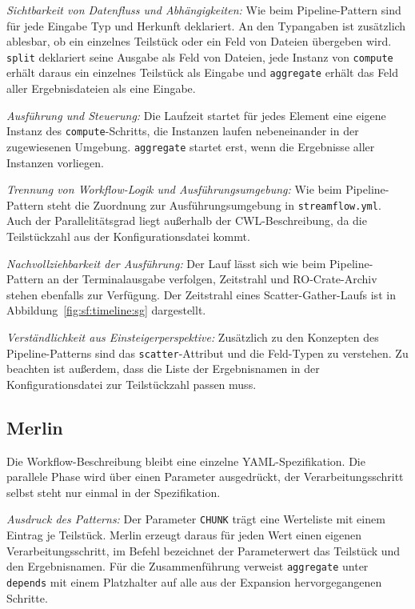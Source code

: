 \emph{Sichtbarkeit von Datenfluss und Abhängigkeiten:} Wie beim
Pipeline-Pattern sind für jede Eingabe Typ und Herkunft deklariert.
An den Typangaben ist zusätzlich ablesbar, ob ein einzelnes Teilstück
oder ein Feld von Dateien übergeben wird. \texttt{split} deklariert
seine Ausgabe als Feld von Dateien, jede Instanz von \texttt{compute}
erhält daraus ein einzelnes Teilstück als Eingabe und
\texttt{aggregate} erhält das Feld aller Ergebnisdateien als eine
Eingabe.

\emph{Ausführung und Steuerung:} Die Laufzeit startet für jedes
Element eine eigene Instanz des \texttt{compute}-Schritts, die
Instanzen laufen nebeneinander in der zugewiesenen Umgebung.
\texttt{aggregate} startet erst, wenn die Ergebnisse aller Instanzen
vorliegen.

\emph{Trennung von Workflow-Logik und Ausführungsumgebung:} Wie beim
Pipeline-Pattern steht die Zuordnung zur Ausführungsumgebung in
\texttt{streamflow.yml}. Auch der Parallelitätsgrad liegt außerhalb
der CWL-Beschreibung, da die Teilstückzahl aus der
Konfigurationsdatei kommt.


\emph{Nachvollziehbarkeit der Ausführung:} Der Lauf lässt sich wie
beim Pipeline-Pattern an der Terminalausgabe verfolgen, Zeitstrahl
und RO-Crate-Archiv stehen ebenfalls zur Verfügung. Der Zeitstrahl
eines Scatter-Gather-Laufs ist in
Abbildung~\ref{fig:sf:timeline:sg} dargestellt.

\emph{Verständlichkeit aus Einsteigerperspektive:} Zusätzlich zu den
Konzepten des Pipeline-Patterns sind das \texttt{scatter}-Attribut
und die Feld-Typen zu verstehen. Zu beachten ist außerdem, dass die
Liste der Ergebnisnamen in der Konfigurationsdatei zur Teilstückzahl
passen muss.

\subsection{Merlin}
\label{sec:lokal:sg:merlin}

Die Workflow-Beschreibung bleibt eine einzelne
YAML-Spezifikation. Die parallele Phase wird über einen Parameter
ausgedrückt, der Verarbeitungsschritt selbst steht nur einmal in der
Spezifikation.

\emph{Ausdruck des Patterns:} Der Parameter \texttt{CHUNK} trägt eine
Werteliste mit einem Eintrag je Teilstück. Merlin erzeugt daraus für
jeden Wert einen eigenen Verarbeitungsschritt, im Befehl bezeichnet
der Parameterwert das Teilstück und den Ergebnisnamen. Für die
Zusammenführung verweist \texttt{aggregate} unter \texttt{depends}
mit einem Platzhalter auf alle aus der Expansion hervorgegangenen
Schritte.

